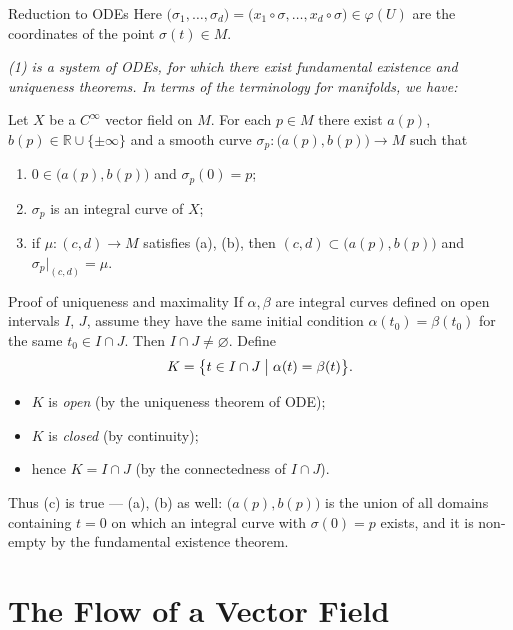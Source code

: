 \documentclass[10pt]{beamer}
\newcommand{\R}{\mathbb{R}}
\begin{document}
\begin{frame}{Reduction to ODEs}
	Here $\bigl( \sigma_1, \dots, \sigma_d \bigr)
		= \bigl( x_1 \circ \sigma, \dots, x_d \circ \sigma \bigr)
		\in \varphi(U)$ are the coordinates of the point
	$\sigma(t) \in M$.
	\medskip

	\emph{(1) is a system of ODEs, for which there exist fundamental
		existence and uniqueness theorems. In terms of the terminology for
		manifolds, we have:}
	\medskip

	\begin{theorem}
		Let $X$ be a $C^\infty$ vector field on $M$. For each $p \in M$
		there exist $a(p)$, $b(p) \in \R \cup \{\pm\infty\}$ and a
		smooth curve $\sigma_p : \bigl( a(p), b(p) \bigr) \to M$ such
		that
		\begin{enumerate}
			\item[(a)] $0 \in \bigl( a(p), b(p) \bigr)$ and
			      $\sigma_p(0) = p$;
			\item[(b)] $\sigma_p$ is an integral curve of $X$;
			\item[(c)] if $\mu : (c, d) \to M$ satisfies (a), (b), then
			      $(c, d) \subset \bigl( a(p), b(p) \bigr)$ and
			      $\sigma_p\big|_{(c,d)} = \mu$.
		\end{enumerate}
	\end{theorem}
\end{frame}

\begin{frame}{Proof of uniqueness and maximality}
	If $\alpha, \beta$ are integral curves defined on open intervals
	$I$, $J$, assume they have the same initial condition
	$\alpha(t_0) = \beta(t_0)$ for the same $t_0 \in I \cap J$. Then
	$I \cap J \neq \varnothing$. Define
	\[
		K = \bigl\{ t \in I \cap J \bigm| \alpha(t) = \beta(t) \bigr\}.
	\]
	\begin{itemize}
		\item $K$ is \emph{open} (by the uniqueness theorem of ODE);
		\item $K$ is \emph{closed} (by continuity);
		\item hence $K = I \cap J$ (by the connectedness of
		      $I \cap J$).
	\end{itemize}
	\medskip
	Thus (c) is true --- (a), (b) as well: $\bigl( a(p), b(p) \bigr)$
	is the union of all domains containing $t = 0$ on which an integral
	curve with $\sigma(0) = p$ exists, and it is non-empty by the
	fundamental existence theorem.
\end{frame}

\section{The Flow of a Vector Field}
\end{document}
